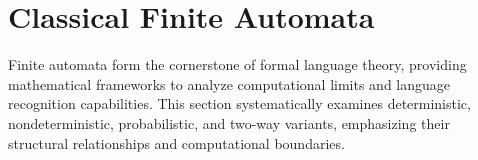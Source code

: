 \section{Classical Finite Automata}
\label{sec:classical-finite-automata} 

Finite automata form the cornerstone of formal language theory, providing mathematical frameworks to analyze computational limits and language recognition capabilities. This section systematically examines deterministic, nondeterministic, probabilistic, and two-way variants, emphasizing their structural relationships and computational boundaries. 








\newpage